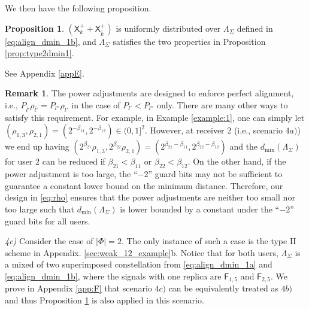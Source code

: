 \documentclass[12pt, draftclsnofoot, onecolumn]{IEEEtran}
\newcommand{\msf}[1]{\mathsf{#1}}
\theoremstyle{definition}
\newtheorem{proposition}{Proposition}
\newtheorem{remark}{Remark}
\begin{document}
We then have the following proposition.
\begin{proposition}\label{prop:type2dmin2}
$(\msf{X}^{+}_k+\msf{X}^{+}_{\bar{k}})$ is uniformly distributed over $\Lambda_{\Sigma}$ defined in \eqref{eq:align_dmin_1b}, and $\Lambda_{\Sigma}$ satisfies the two properties in Proposition \ref{prop:type2dmin1}.
\end{proposition}
\begin{IEEEproof}
See Appendix \ref{appE}.
\end{IEEEproof}


\begin{remark}
The power adjustments are designed to enforce perfect alignment, i.e., $P_{\bar{l'}}\rho_{\bar{l'}} = P_{l''}\rho_{l'}$ in the case of $P_{l'}<P_{l''}$ only. There are many other ways to satisfy this requirement. For example, in Example \ref{example:1}, one can simply let $(\rho_{1,3},\rho_{2,1})=(2^{-\beta_{11}},2^{-\beta_{12}})\in (0,1]^2$. However, at receiver 2 (i.e., scenario $4a)$) we end up having $(2^{\beta_{21}}\rho_{1,3},2^{\beta_{22}}\rho_{2,1})=(2^{\beta_{21}-\beta_{11}},2^{\beta_{22}-\beta_{12}})$ and the $d_{\min}(\Lambda_{\Sigma})$ for user 2 can be reduced if $\beta_{21}<\beta_{11}$ or $\beta_{22}<\beta_{12}$. On the other hand, if the power adjustment is too large, the ``$-2$'' guard bits may not be sufficient to guarantee a constant lower bound on the minimum distance. Therefore, our design in \eqref{eq:rho} ensures that the power adjustments are neither too small nor too large such that $d_{\min}(\Lambda_{\Sigma})$ is lower bounded by a constant under the ``$-2$'' guard bits for all users.
\end{remark}


\emph{4c)} Consider the case of $|\Phi|=2$. The only instance of such a case is the type II scheme in Appendix. \ref{sec:weak_12_example}b. Notice that for both users, $\Lambda_{\Sigma}$ is a mixed of two superimposed constellation from \eqref{eq:align_dmin_1a} and \eqref{eq:align_dmin_1b}, where the signals with one replica are $\msf{F}_{1,5}$ and $\msf{F}_{2,5}$. We prove in Appendix \ref{app:F} that scenario $4c)$ can be equivalently treated as $4b)$ and thus Proposition \ref{prop:type2dmin2} is also applied in this scenario.
\end{document}
